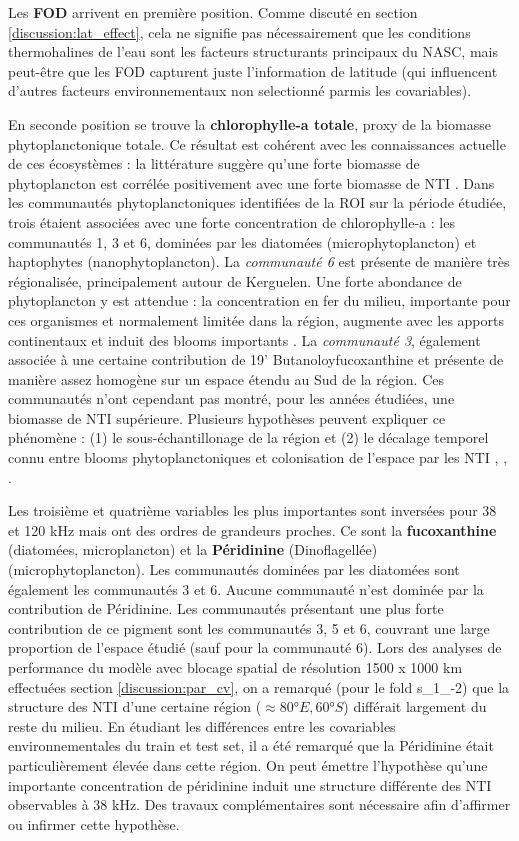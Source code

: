\documentclass[11pt,a4paper,oneside]{report}
\begin{document}
	Les \textbf{FOD} arrivent en première position. Comme discuté en section \ref{discussion:lat_effect}, cela ne signifie pas nécessairement que les conditions thermohalines de l'eau sont les facteurs structurants principaux du NASC, mais peut-être que les FOD capturent juste l'information de latitude (qui influencent d'autres facteurs environnementaux non selectionné parmis les covariables). 
	
	En seconde position se trouve la \textbf{chlorophylle-a totale}, proxy de la biomasse phytoplanctonique totale. Ce résultat est cohérent avec les connaissances actuelle de ces écosystèmes : la littérature suggère qu'une forte biomasse de phytoplancton est corrélée positivement avec une forte biomasse de NTI \cite{carlotti2015mesozooplankton}. Dans les communautés phytoplanctoniques identifiées de la ROI sur la période étudiée, trois étaient associées avec une forte concentration de chlorophylle-a : les communautés 1, 3 et 6, dominées par les diatomées (microphytoplancton) et haptophytes (nanophytoplancton). La \textit{communauté 6} est présente de manière très régionalisée, principalement autour de Kerguelen. Une forte abondance de phytoplancton y est attendue : la concentration en fer du milieu, importante pour ces organismes et normalement limitée dans la région, augmente avec les apports continentaux et induit des blooms importants \cite{Blain2007}. La \textit{communauté 3}, également associée à une certaine contribution de 19' Butanoloyfucoxanthine et présente de manière assez homogène sur un espace étendu au Sud de la région. Ces communautés n'ont cependant pas montré, pour les années étudiées, une biomasse de NTI supérieure. Plusieurs hypothèses peuvent expliquer ce phénomène : (1) le sous-échantillonage de la région et (2) le décalage temporel connu entre blooms phytoplanctoniques et colonisation de l'espace par les NTI \cite{nicholson2025satellite}, \cite{kauko2021phenology}, \cite{lampe2026differences}.
	
	Les troisième et quatrième variables les plus importantes sont inversées pour 38 et 120 kHz mais ont des ordres de grandeurs proches. Ce sont la \textbf{fucoxanthine} (diatomées, microplancton) et la \textbf{Péridinine} (Dinoflagellée) (microphytoplancton). Les communautés dominées par les diatomées sont également les communautés 3 et 6. Aucune communauté n'est dominée par la contribution de Péridinine. Les communautés présentant une plus forte contribution de ce pigment sont les communautés 3, 5 et 6, couvrant une large proportion de l'espace étudié (sauf pour la communauté 6). Lors des analyses de performance du modèle avec blocage spatial de résolution 1500 x 1000 km effectuées section \ref{discussion:par_cv}, on a remarqué (pour le fold s\_1\_-2) que la structure des NTI d'une certaine région ($\approx 80°E, 60°S$) différait largement du reste du milieu. En étudiant les différences entre les covariables environnementales du train et test set, il a été remarqué que la Péridinine était particulièrement élevée dans cette région. On peut émettre l'hypothèse qu'une importante concentration de péridinine induit une structure différente des NTI observables à 38 kHz. Des travaux complémentaires sont nécessaire afin d'affirmer ou infirmer cette hypothèse.
	
\end{document}
